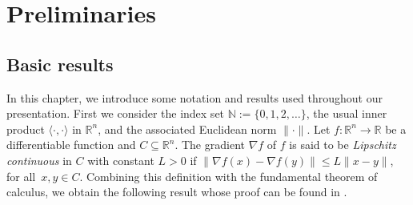 \chapter{Preliminaries}  \label{chap:Prel}

\section{Basic results}

In this chapter, we introduce  some notation and results used throughout our presentation.  First we  consider the  index set  ${\mathbb{N}}:=\{0,1,2,\ldots\}$,  the usual inner  product  $\langle \cdot,\cdot \rangle$ in $\mathbb{R}^n$, and the associated Euclidean norm    $\|\cdot\|$.
Let  $f:\mathbb{R}^n \to \mathbb{R}$ be a differentiable function and $C \subseteq \mathbb{R}^n$. The  gradient $\nabla f$ of $f$ is said to be {\it Lipschitz continuous} in $C$ with constant $L>0$ if $\|\nabla f(x)-\nabla f(y)\|\leq L \|x-y\|$, for all~$x, y\in C$. Combining this definition with the fundamental theorem of calculus, we obtain the following result whose proof can be found in \cite[Proposition A.24]{Bertsekas1999}.

